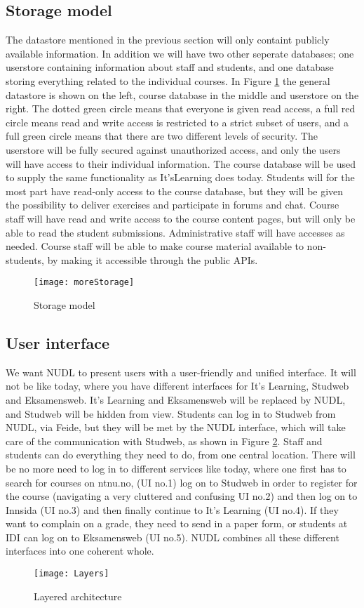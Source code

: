 	\subsection{Storage model}
		The datastore mentioned in the previous section will only containt publicly available information. In addition we will have two other seperate databases; one userstore containing information about staff and students, and one database storing everything related to the individual courses. In Figure \ref{fig:storagemodel} the general datastore is shown on the left, course database in the middle and userstore on the right. The dotted green circle means that everyone is given read access, a full red circle means read and write access is restricted to a strict subset of users, and a full green circle means that there are two different levels of security. The userstore will be fully secured against unauthorized access, and only the users will have access to their individual information. The course database will be used to supply the same functionality as It'sLearning does today. Students will for the most part have read-only access to the course database, but they will be given the possibility to deliver exercises and participate in forums and chat. Course staff will have read and write access to the course content pages, but will only be able to read the student submissions. Administrative staff will have accesses as needed. 
Course staff will be able to make course material available to non-students, by making it accessible through the public APIs. 
\begin{figure}
\centering
\texttt{[image: moreStorage]}
\caption{Storage model}
\label{fig:storagemodel}
\end{figure}

		
	\subsection{User interface} 
		We want NUDL to present users with a user-friendly and unified interface. It will not be like today, where you have different interfaces for It's Learning, Studweb and Eksamensweb. It's Learning and Eksamensweb will be replaced by NUDL, and Studweb will be hidden from view. Students can log in to Studweb from NUDL, via Feide, but they will be met by the NUDL interface, which will take care of the communication with Studweb, as shown in Figure \ref{fig:layers}. Staff and students can do everything they need to do, from one central location. There will be no more need to log in to different services like today, where one first has to search for courses on ntnu.no, (UI no.1) log on to Studweb in order to register for the course (navigating a very cluttered and confusing UI no.2) and then log on to Innsida (UI no.3) and then finally continue to It's Learning (UI no.4). If they want to complain on a grade, they need to send in a paper form, or students at IDI can log on to Eksamensweb (UI no.5). NUDL combines all these different interfaces into one coherent whole. 
\begin{figure}
\centering
\texttt{[image: Layers]}
\caption{Layered architecture}
\label{fig:layers}
\end{figure}